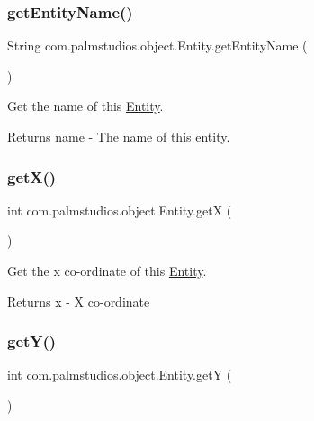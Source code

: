 \subsubsection{\texorpdfstring{get\+Entity\+Name()}{getEntityName()}}
{\footnotesize\ttfamily String com.\+palmstudios.\+object.\+Entity.\+get\+Entity\+Name (\begin{DoxyParamCaption}{ }\end{DoxyParamCaption})}

Get the name of this \hyperlink{classcom_1_1palmstudios_1_1object_1_1_entity}{Entity}.

\begin{DoxyReturn}{Returns}
name -\/ The name of this entity. 
\end{DoxyReturn}
\mbox{\label{classcom_1_1palmstudios_1_1object_1_1_entity_a8b7617e59d28fda1735a57440b92f5fb}} 
\subsubsection{\texorpdfstring{get\+X()}{getX()}}
{\footnotesize\ttfamily int com.\+palmstudios.\+object.\+Entity.\+getX (\begin{DoxyParamCaption}{ }\end{DoxyParamCaption})}

Get the x co-\/ordinate of this \hyperlink{classcom_1_1palmstudios_1_1object_1_1_entity}{Entity}.

\begin{DoxyReturn}{Returns}
x -\/ X co-\/ordinate 
\end{DoxyReturn}
\mbox{\label{classcom_1_1palmstudios_1_1object_1_1_entity_ad4cf3590152be1d829c58b8c55ee88ad}} 
\subsubsection{\texorpdfstring{get\+Y()}{getY()}}
{\footnotesize\ttfamily int com.\+palmstudios.\+object.\+Entity.\+getY (\begin{DoxyParamCaption}{ }\end{DoxyParamCaption})}

